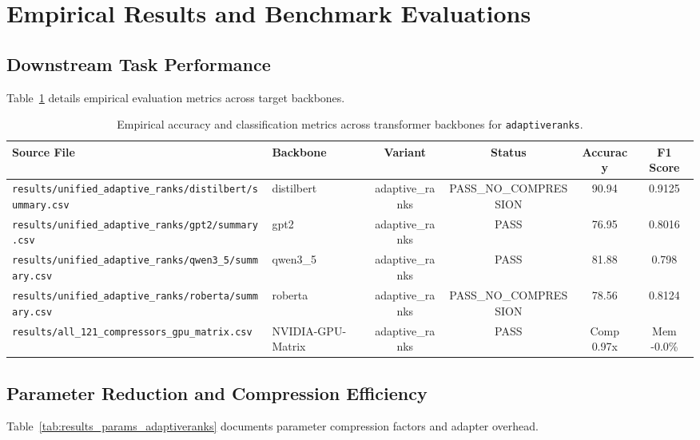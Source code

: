 \section{Empirical Results and Benchmark Evaluations}

\subsection{Downstream Task Performance}
Table~\ref{tab:results_acc_adaptiveranks} details empirical evaluation metrics across target backbones.

\begin{table}[t]
\centering
\small
\begin{tabular}{llcccc}
\toprule
\textbf{Source File} & \textbf{Backbone} & \textbf{Variant} & \textbf{Status} & \textbf{Accuracy} & \textbf{F1 Score} \\
\midrule
\texttt{results/unified\_adaptive\_ranks/distilbert/summary.csv} & distilbert & adaptive\_ranks & PASS\_NO\_COMPRESSION & 90.94 & 0.9125 \\
\texttt{results/unified\_adaptive\_ranks/gpt2/summary.csv} & gpt2 & adaptive\_ranks & PASS & 76.95 & 0.8016 \\
\texttt{results/unified\_adaptive\_ranks/qwen3\_5/summary.csv} & qwen3\_5 & adaptive\_ranks & PASS & 81.88 & 0.798 \\
\texttt{results/unified\_adaptive\_ranks/roberta/summary.csv} & roberta & adaptive\_ranks & PASS\_NO\_COMPRESSION & 78.56 & 0.8124 \\
\texttt{results/all\_121\_compressors\_gpu\_matrix.csv} & NVIDIA-GPU-Matrix & adaptive\_ranks & PASS & Comp 0.97x & Mem -0.0\% \\
\bottomrule
\end{tabular}
\caption{Empirical accuracy and classification metrics across transformer backbones for \texttt{adaptiveranks}.}
\label{tab:results_acc_adaptiveranks}
\end{table}

\subsection{Parameter Reduction and Compression Efficiency}
Table~\ref{tab:results_params_adaptiveranks} documents parameter compression factors and adapter overhead.

